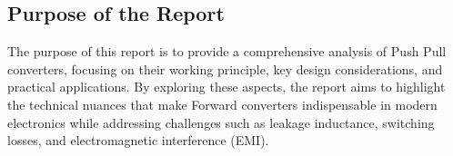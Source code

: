 \subsection{Purpose of the Report}
\noindent The purpose of this report is to provide a comprehensive analysis of Push Pull converters, focusing on their working principle, key design considerations, and practical applications. By exploring these aspects, the report aims to highlight the technical nuances that make Forward converters indispensable in modern electronics while addressing challenges such as leakage inductance, switching losses, and electromagnetic interference (EMI).
